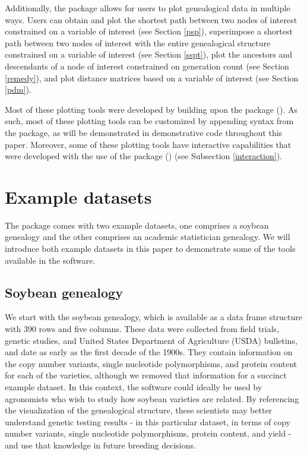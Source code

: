\documentclass[article,shortnames]{jss}
\begin{document}
Additionally, the  package allows for users to plot genealogical data in multiple ways. Users can obtain and plot the shortest path between two nodes of interest constrained on a variable of interest (see Section \ref{psp}), superimpose a shortest path between two nodes of interest with the entire genealogical structure constrained on a variable of interest (see Section \ref{sspt}), plot the ancestors and descendants of a node of interest constrained on generation count (see Section \ref{remedy}), and plot distance matrices based on a variable of interest (see Section \ref{pdm}).

Most of these plotting tools were developed by building upon the  package (\citealt{ggplot2}). As such, most of these plotting tools can be customized by appending syntax from the  package, as will be demonstrated in demonstrative code throughout this paper. Moreover, some of these plotting tools have interactive capabilities that were developed with the use of the  package (\citealt{plotly}) (see Subsection \ref{interaction}).

\clearpage

\section{Example datasets}
\label{exData}

The  package comes with two example datasets, one comprises a soybean genealogy and the other comprises an academic statistician genealogy. We will introduce both example datasets in this paper to demonstrate some of the tools available in the software.

\subsection{Soybean genealogy}

We start with the soybean genealogy, which is available as a data frame structure with 390 rows and five columns. These data were collected from field trials, genetic studies, and United States Department of Agriculture (USDA) bulletins, and date as early as the first decade of the 1900s. They contain information on the copy number variants, single nucleotide polymorphisms, and protein content for each of the varieties, although we removed that information for a succinct example dataset. In this context, the software could ideally be used by agronomists who wish to study how soybean varieties are related. By referencing the visualization of the genealogical structure, these scientists may better understand genetic testing results - in this particular dataset, in terms of copy number variants, single nucleotide polymorphisms, protein content, and yield - and use that knowledge in future breeding decisions.
\end{document}
